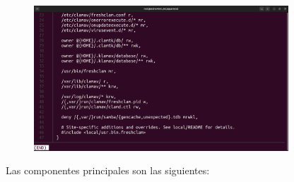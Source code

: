 \documentclass{article}
\begin{document}
\begin{figure}[H]
    \centering
    \includegraphics[width=0.85\textwidth]{imagenes/Captura desde 2022-10-18 16-14-08.png}
\end{figure}

Las componentes principales son las siguientes:

\end{document}
